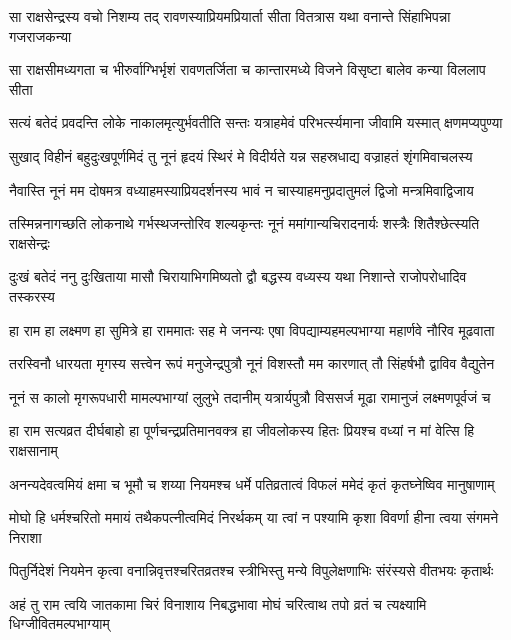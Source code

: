 
\twolineshloka
{सा राक्षसेन्द्रस्य वचो निशम्य तद् रावणस्याप्रियमप्रियार्ता}
{सीता वितत्रास यथा वनान्ते सिंहाभिपन्ना गजराजकन्या} %

\twolineshloka
{सा राक्षसीमध्यगता च भीरुर्वाग्भिर्भृशं रावणतर्जिता च}
{कान्तारमध्ये विजने विसृष्टा बालेव कन्या विललाप सीता} %

\twolineshloka
{सत्यं बतेदं प्रवदन्ति लोके नाकालमृत्युर्भवतीति सन्तः}
{यत्राहमेवं परिभर्त्स्यमाना जीवामि यस्मात् क्षणमप्यपुण्या} %

\twolineshloka
{सुखाद् विहीनं बहुदुःखपूर्णमिदं तु नूनं हृदयं स्थिरं मे}
{विदीर्यते यन्न सहस्रधाद्य वज्राहतं शृंगमिवाचलस्य} %

\twolineshloka
{नैवास्ति नूनं मम दोषमत्र वध्याहमस्याप्रियदर्शनस्य}
{भावं न चास्याहमनुप्रदातुमलं द्विजो मन्त्रमिवाद्विजाय} %

\twolineshloka
{तस्मिन्ननागच्छति लोकनाथे गर्भस्थजन्तोरिव शल्यकृन्तः}
{नूनं ममांगान्यचिरादनार्यः शस्त्रैः शितैश्छेत्स्यति राक्षसेन्द्रः} %

\twolineshloka
{दुःखं बतेदं ननु दुःखिताया मासौ चिरायाभिगमिष्यतो द्वौ}
{बद्धस्य वध्यस्य यथा निशान्ते राजोपरोधादिव तस्करस्य} %

\twolineshloka
{हा राम हा लक्ष्मण हा सुमित्रे हा राममातः सह मे जनन्यः}
{एषा विपद्याम्यहमल्पभाग्या महार्णवे नौरिव मूढवाता} %

\twolineshloka
{तरस्विनौ धारयता मृगस्य सत्त्वेन रूपं मनुजेन्द्रपुत्रौ}
{नूनं विशस्तौ मम कारणात् तौ सिंहर्षभौ द्वाविव वैद्युतेन} %

\twolineshloka
{नूनं स कालो मृगरूपधारी मामल्पभाग्यां लुलुभे तदानीम्}
{यत्रार्यपुत्रौ विससर्ज मूढा रामानुजं लक्ष्मणपूर्वजं च} %

\twolineshloka
{हा राम सत्यव्रत दीर्घबाहो हा पूर्णचन्द्रप्रतिमानवक्त्र}
{हा जीवलोकस्य हितः प्रियश्च वध्यां न मां वेत्सि हि राक्षसानाम्} %

\twolineshloka
{अनन्यदेवत्वमियं क्षमा च भूमौ च शय्या नियमश्च धर्मे}
{पतिव्रतात्वं विफलं ममेदं कृतं कृतघ्नेष्विव मानुषाणाम्} %

\twolineshloka
{मोघो हि धर्मश्चरितो ममायं तथैकपत्नीत्वमिदं निरर्थकम्}
{या त्वां न पश्यामि कृशा विवर्णा हीना त्वया संगमने निराशा} %

\twolineshloka
{पितुर्निदेशं नियमेन कृत्वा वनान्निवृत्तश्चरितव्रतश्च}
{स्त्रीभिस्तु मन्ये विपुलेक्षणाभिः संरंस्यसे वीतभयः कृतार्थः} %

\twolineshloka
{अहं तु राम त्वयि जातकामा चिरं विनाशाय निबद्धभावा}
{मोघं चरित्वाथ तपो व्रतं च त्यक्ष्यामि धिग्जीवितमल्पभाग्याम्} %

